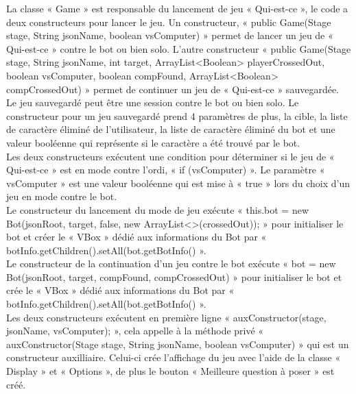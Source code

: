 \documentclass[a4paper]{article}
\begin{document}
La classe « Game » est responsable du lancement de jeu « Qui-est-ce », le code a deux constructeurs pour lancer le jeu. Un constructeur, « public Game(Stage stage, String jsonName, boolean vsComputer) » permet de lancer un jeu de « Qui-est-ce » contre le bot ou bien solo. L’autre constructeur « public Game(Stage stage, String jsonName, int target, ArrayList<Boolean> playerCrossedOut, boolean vsComputer, boolean compFound, ArrayList<Boolean> compCrossedOut) » permet de continuer un jeu de « Qui-est-ce » sauvegardée.\\
Le jeu sauvegardé peut être une session contre le bot ou bien solo. Le constructeur pour un jeu sauvegardé prend 4 paramètres de plus, la cible, la liste de caractère éliminé de l’utilisateur, la liste de caractère éliminé du bot et une valeur booléenne qui représente si le caractère a été trouvé par le bot.\\

Les deux constructeurs exécutent une condition pour déterminer si le jeu de « Qui-est-ce » est en mode contre l'ordi, « if (vsComputer) ». Le paramètre « vsComputer » est une valeur booléenne qui est mise à « true » lors du choix d’un jeu en mode contre le bot.\\
Le constructeur du lancement du mode de jeu exécute « this.bot = new Bot(jsonRoot, target, false, new ArrayList<>(crossedOut)); » pour initialiser le bot et créer le « VBox » dédié aux informations du Bot par « botInfo.getChildren().setAll(bot.getBotInfo() ».\\
Le constructeur de la continuation d’un jeu contre le bot exécute « bot = new Bot(jsonRoot, target, compFound, compCrossedOut) » pour initialiser le bot et crée le « VBox » dédié aux informations du Bot par « botInfo.getChildren().setAll(bot.getBotInfo() ».\\
Les deux constructeurs exécutent en première ligne « auxConstructor(stage, jsonName, vsComputer); », cela appelle à la méthode privé « auxConstructor(Stage stage, String jsonName, boolean vsComputer) » qui est un constructeur auxilliaire. Celui-ci crée l’affichage du jeu avec l’aide de la classe « Display » et « Options », de plus le bouton « Meilleure question à poser » est créé.\\
\end{document}
